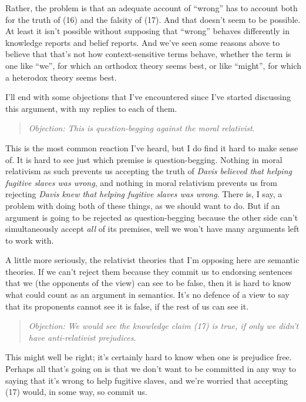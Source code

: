 \documentclass[
  10pt,
  letterpaper,
  DIV=11,
  numbers=noendperiod,
  twoside]{scrartcl}
\begin{document}
Rather, the problem is that an adequate account of ``wrong'' has to
account both for the truth of (16) and the falsity of (17). And that
doesn't seem to be possible. At least it isn't possible without
supposing that ``wrong'' behaves differently in knowledge reports and
belief reports. And we've seen some reasons above to believe that that's
not how context-sensitive terms behave, whether the term is one like
``we'', for which an orthodox theory seems best, or like ``might'', for
which a heterodox theory seems best.

I'll end with some objections that I've encountered since I've started
discussing this argument, with my replies to each of them.

\begin{quote}
\emph{Objection: This is question-begging against the moral relativist}.
\end{quote}

This is the most common reaction I've heard, but I do find it hard to
make sense of. It is hard to see just which premise is question-begging.
Nothing in moral relativism as such prevents us accepting the truth of
\emph{Davis believed that helping fugitive slaves was wrong}, and
nothing in moral relativism prevents us from rejecting \emph{Davis knew
that helping fugitive slaves was wrong}. There is, I say, a problem with
doing both of these things, as we should want to do. But if an argument
is going to be rejected as question-begging because the other side can't
simultaneously accept \emph{all} of its premises, well we won't have
many arguments left to work with.

A little more seriously, the relativist theories that I'm opposing here
are semantic theories. If we can't reject them because they commit us to
endorsing sentences that we (the opponents of the view) can see to be
false, then it is hard to know what could count as an argument in
semantics. It's no defence of a view to say that its proponents cannot
see it is false, if the rest of us can see it.

\begin{quote}
\emph{Objection: We would see the knowledge claim (17) is true, if only
we didn't have anti-relativist prejudices}.
\end{quote}

This might well be right; it's certainly hard to know when one is
prejudice free. Perhaps all that's going on is that we don't want to be
committed in any way to saying that it's wrong to help fugitive slaves,
and we're worried that accepting (17) would, in some way, so commit us.
\end{document}
